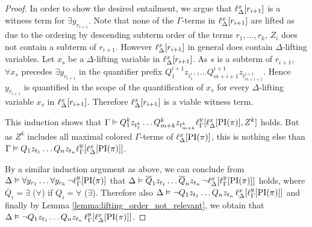 \begin{proof}
	In order to show the desired entailment, we %
	argue that $\lifdelta{ r_{i+1} }$ is a witness term for $\exists y_{r_{i+1}}$.
	Note that none of the $\Gamma$-terms in $\lifdelta{ r_{i+1} }$ are lifted as due to the ordering by descending subterm order of the terms $r_1, \dots, r_k$, $Z_i$ does not contain a subterm of $r_{i+1}$.
	However $\lifdelta{ r_{i+1} }$ in general does contain $\Delta$-lifting variables. Let $x_s$ be a $\Delta$-lifting variable in $\lifdelta{ r_{i+1} }$.
	As $s$ is a subterm of $r_{i+1}$, $\forall x_s$ precedes $\exists y_{r_{i+1}}$ in the quantifier prefix $Q_1^{i+1} z_{t_1^{i+1}} \dots Q_{m+{i+1}}^{i+1} z_{t_{m+{i+1}}^{i+1}}$.
	Hence $y_{r_{i+1}}$ is quantified in the scope of the quantification of $x_s$ for every $\Delta$-lifting variable $x_s$ in $\lifdelta{ r_{i+1} }$.
	Therefore $\lifdelta{ r_{i+1} }$ is a viable witness term.

	This induction shows that 
	$\Gamma \entails Q_1^k z_{t_1^k} \dots Q_{m+k}^k z_{t_{m+k}^k} \lifgamma{ \lifdelta{\PI(\pi) }, Z^k }$ holds. 
	But as $Z^k$ includes all maximal colored $\Gamma$-terms of $\lifdelta{\PI(\pi)}$,
	this is nothing else than $\Gamma \entails Q_1 z_{t_1} \dots Q_n z_{t_n} \lifgamma{ \lifdelta{ \PI( \pi) } }$.

	By a similar induction argument as above, we can conclude from 
	$\Delta \entails \forall y_{r_1} \dots \forall y_{r_{k}}\,\lnot \lift{\Gamma}{\PI(\pi)}{y}$
	that 
	$\Delta \entails \overline Q_1 z_{t_1} \dots \overline Q_n z_{t_n}\,\lnot \lft{\Delta}{x}{\lft{\Gamma}{y}{\PI(\pi)}}$ holds, where $\overline Q_i = \exists$ ($\forall$) if $Q_i = \forall$ ($\exists$).
	Therefore also
	$\Delta \entails\nolinebreak{} \lnot Q_1 z_{t_1} \dots Q_n z_{t_n}\,\lft{\Delta}{x}{\lft{\Gamma}{y}{\PI(\pi)}}$ and
	finally by Lemma \ref{lemma:lifting_order_not_relevant}, we obtain that 
	$\Delta \entails\nolinebreak{} \lnot Q_1 z_{t_1} \dots Q_n z_{t_n}\,\lft{\Gamma}{y}{\lft{\Delta}{x}{\PI(\pi)}}$.
\end{proof}


